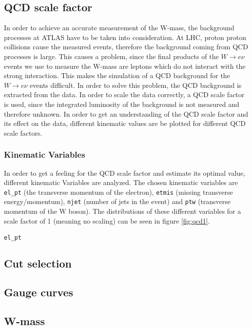 \subsection{QCD scale factor}
In order to achieve an accurate measurement of the W-mass, the background processes at ATLAS have to be taken into consideration.
At LHC, proton proton collisions cause the measured events, therefore the background coming from QCD processes is large. This causes a problem,
since the final products of the $W \rightarrow e\nu$ events we use to measure the W-mass are leptons which do not interact with the strong interaction.
This makes the simulation of a QCD background for the $W \rightarrow e\nu$ events difficult. In order to solve this problem, the QCD background is extracted
from the data. In order to scale the data correctly, a QCD scale factor is used, since the integrated luminosity of the background is not measured and therefore
unknown. In order to get an understanding of the QCD scale factor and its effect on the data, different kinematic values are be plotted for different 
QCD scale factors.

\subsubsection{Kinematic Variables}
In order to get a feeling for the QCD scale factor and estimate its optimal value, different kinematic Variables are analyzed.
The chosen kinematic variables are \texttt{el\_pt} (the transverse momentum of the electron), \texttt{etmis} (missing transverse energy/momentum),
\texttt{njet} (number of jets in the event) and \texttt{ptw} (transverse momentum of the W boson). The distributions of these different variables
for a scale factor of 1 (meaning no scaling) can be seen in figure \ref{fig:qcd1}.

\texttt{el\_pt}
\subsection{Cut selection}

\subsection{Gauge curves}

\subsection{W-mass }